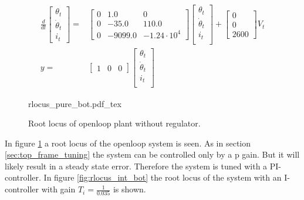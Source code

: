 \documentclass[../../../Main]{subfiles}
\begin{document}
\begin{equation}
      \label{eq:bottom_state_eq}
      \begin{split}
      \frac{d}{dt}
    \begin{bmatrix}
        \theta_t \\
        \dot \theta_t \\
        i_t
    \end{bmatrix}
    =&
    \begin{bmatrix}0 & 1.0 & 0\\ 0 & -35.0 & 110.0\\ 0 & -9099.0 & -1.24\cdot10^4\end{bmatrix}
    \begin{bmatrix}
        \theta_t \\
        \dot \theta_t \\
        i_t \\
    \end{bmatrix}
    +
    \begin{bmatrix}
      0\\ 0\\ 2600
    \end{bmatrix}
    V_t
\\
      y =&
    \begin{bmatrix}
        1 & 0 & 0
    \end{bmatrix}
    \begin{bmatrix}
        \theta_t \\
        \dot \theta_t\\
        i_t\\
    \end{bmatrix}
    \end{split}
\end{equation}


\begin{figure}[H]
\centering
\def\svgwidth{\textwidth}
{rlocus_pure_bot.pdf_tex}
\caption{Root locus of openloop plant without regulator.}
\label{fig:rlocus_pure_bot}
\end{figure}

In figure \ref{fig:rlocus_pure_bot} a root locus of the openloop system is seen. As in section \ref{sec:top_frame_tuning} the system can be controlled only by a p gain. But it will likely result in a steady state error. Therefore the system is tuned with a PI-controller. In figure \ref{fig:rlocus_int_bot} the root locus of the system with an I-controller with gain $T_i = \frac{1}{0.035}$ is shown.
\end{document}
